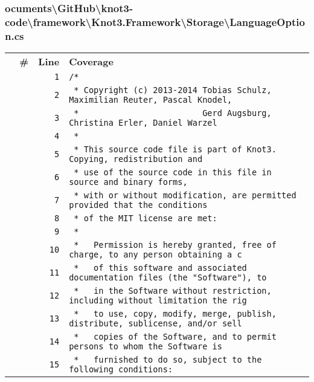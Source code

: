 \documentclass[a4paper,10pt]{article}
\begin{document}
\subsubsection{ocuments\textbackslash GitHub\textbackslash knot3-code\textbackslash framework\textbackslash Knot3.Framework\textbackslash Storage\textbackslash LanguageOption.cs}
\begin{longtable}[l]{lrrl}
\textbf{} & \textbf{\#} & \textbf{Line} & \textbf{Coverage}\\
\cellcolor{gray} &  & \verb~1~ & \verb~/*~\\
\cellcolor{gray} &  & \verb~2~ & \verb~ * Copyright (c) 2013-2014 Tobias Schulz, Maximilian Reuter, Pascal Knodel,~\\
\cellcolor{gray} &  & \verb~3~ & \verb~ *                         Gerd Augsburg, Christina Erler, Daniel Warzel~\\
\cellcolor{gray} &  & \verb~4~ & \verb~ *~\\
\cellcolor{gray} &  & \verb~5~ & \verb~ * This source code file is part of Knot3. Copying, redistribution and~\\
\cellcolor{gray} &  & \verb~6~ & \verb~ * use of the source code in this file in source and binary forms,~\\
\cellcolor{gray} &  & \verb~7~ & \verb~ * with or without modification, are permitted provided that the conditions~\\
\cellcolor{gray} &  & \verb~8~ & \verb~ * of the MIT license are met:~\\
\cellcolor{gray} &  & \verb~9~ & \verb~ *~\\
\cellcolor{gray} &  & \verb~10~ & \verb~ *   Permission is hereby granted, free of charge, to any person obtaining a c~\\
\cellcolor{gray} &  & \verb~11~ & \verb~ *   of this software and associated documentation files (the "Software"), to ~\\
\cellcolor{gray} &  & \verb~12~ & \verb~ *   in the Software without restriction, including without limitation the rig~\\
\cellcolor{gray} &  & \verb~13~ & \verb~ *   to use, copy, modify, merge, publish, distribute, sublicense, and/or sell~\\
\cellcolor{gray} &  & \verb~14~ & \verb~ *   copies of the Software, and to permit persons to whom the Software is~\\
\cellcolor{gray} &  & \verb~15~ & \verb~ *   furnished to do so, subject to the following conditions:~\\

\end{longtable}
\end{document}

